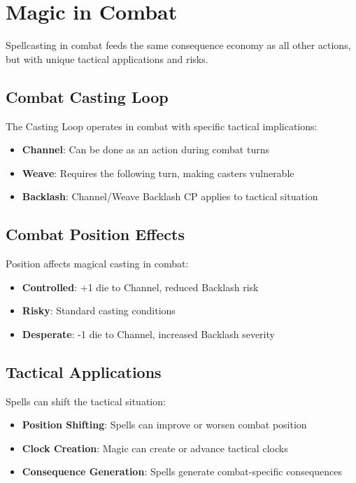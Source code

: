 \section*{Magic in Combat}

Spellcasting in combat feeds the same consequence economy as all other actions, but with unique tactical applications and risks.

\subsection*{Combat Casting Loop}

The Casting Loop operates in combat with specific tactical implications:

\begin{itemize}
    \item \textbf{Channel}: Can be done as an action during combat turns
    \item \textbf{Weave}: Requires the following turn, making casters vulnerable
    \item \textbf{Backlash}: Channel/Weave Backlash CP applies to tactical situation
\end{itemize}

\subsection*{Combat Position Effects}

Position affects magical casting in combat:

\begin{itemize}
    \item \textbf{Controlled}: +1 die to Channel, reduced Backlash risk
    \item \textbf{Risky}: Standard casting conditions
    \item \textbf{Desperate}: -1 die to Channel, increased Backlash severity
\end{itemize}

\subsection*{Tactical Applications}

Spells can shift the tactical situation:

\begin{itemize}
    \item \textbf{Position Shifting}: Spells can improve or worsen combat position
    \item \textbf{Clock Creation}: Magic can create or advance tactical clocks
    \item \textbf{Consequence Generation}: Spells generate combat-specific consequences
\end{itemize}


